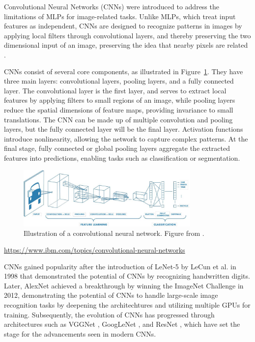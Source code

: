 Convolutional Neural Networks (CNNs) \cite{lecun1995} were introduced to address the limitations of MLPs for image-related tasks. Unlike MLPs, which treat input features as independent, CNNs are designed to recognize patterns in images by applying local filters through convolutional layers, and thereby preserving the two dimensional input of an image, preserving the idea that nearby pixels are related \cite{lecun1998,NIPS2012_c399862d,zhang2023dive}. %


CNNs consist of several core components, as illustrated in Figure~\ref{fig:cnn_illustration}. They have three main layers: convolutional layers, pooling layers, and a fully connected layer. The convolutional layer is the first layer, and serves to extract local features by applying filters to small regions of an image, while pooling layers reduce the spatial dimensions of feature maps, providing invariance to small translations. The CNN can be made up of multiple convolution and pooling layers, but the fully connected layer will be the final layer. Activation functions introduce nonlinearity, allowing the network to capture complex patterns. At the final stage, fully connected or global pooling layers aggregate the extracted features into predictions, enabling tasks such as classification or segmentation.


\begin{figure}[ht]
    \centering
    \includegraphics[width=0.8\textwidth]{Images/CNN_illustration.jpg} 
    \caption{Illustration of a convolutional neural network. Figure from \cite{mathworks_cnn}. }
    \label{fig:cnn_illustration}
\end{figure}

\url{https://www.ibm.com/topics/convolutional-neural-networks}

CNNs gained popularity after the introduction of LeNet-5 by LeCun et al. in 1998 \cite{lecun1998} that demonstrated the potential of CNNs by recognizing handwritten digits. Later, AlexNet \cite{NIPS2012_c399862d} achieved a breakthrough by winning the ImageNet Challenge in 2012, demonstrating the potential of CNNs to handle large-scale image recognition tasks by deepening the architechtures and utilizing multiple GPUs for training. Subsequently, the evolution of CNNs has progressed through architectures such as VGGNet \cite{simonyan2015deepconvolutionalnetworkslargescale}, GoogLeNet \cite{szegedy2014goingdeeperconvolutions}, and ResNet \cite{he2016}, which have set the stage for the advancements seen in modern CNNs.

